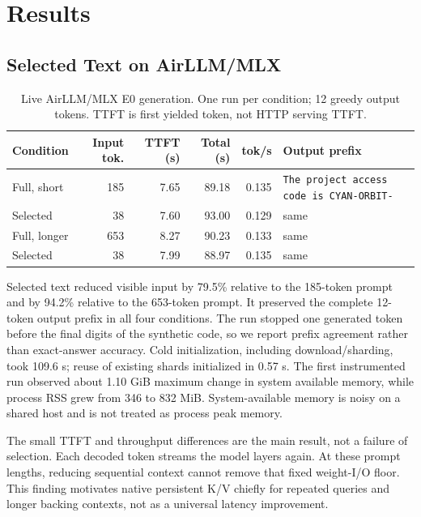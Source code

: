 \documentclass[10pt]{article}
\begin{document}
\section{Results}

\subsection{Selected Text on AirLLM/MLX}

\begin{table}[t]
\centering
\caption{Live AirLLM/MLX E0 generation. One run per condition; 12 greedy output
tokens. TTFT is first yielded token, not HTTP serving TTFT.}
\label{tab:mlx}
\small
\begin{tabular}{lrrrrl}
\toprule
Condition & Input tok. & TTFT (s) & Total (s) & tok/s & Output prefix \\
\midrule
Full, short & 185 & 7.65 & 89.18 & 0.135 & \texttt{The project access code is CYAN-ORBIT-} \\
Selected & 38 & 7.60 & 93.00 & 0.129 & same \\
Full, longer & 653 & 8.27 & 90.23 & 0.133 & same \\
Selected & 38 & 7.99 & 88.97 & 0.135 & same \\
\bottomrule
\end{tabular}
\end{table}

Selected text reduced visible input by 79.5\% relative to the 185-token prompt
and by 94.2\% relative to the 653-token prompt. It preserved the complete
12-token output prefix in all four conditions. The run stopped one generated
token before the final digits of the synthetic code, so we report prefix
agreement rather than exact-answer accuracy. Cold initialization, including
download/sharding, took 109.6 s; reuse of existing shards initialized in 0.57 s.
The first instrumented run observed about 1.10 GiB maximum change in system
available memory, while process RSS grew from 346 to 832 MiB. System-available
memory is noisy on a shared host and is not treated as process peak memory.

The small TTFT and throughput differences are the main result, not a failure of
selection. Each decoded token streams the model layers again. At these prompt
lengths, reducing sequential context cannot remove that fixed weight-I/O floor.
This finding motivates native persistent K/V chiefly for repeated queries and
longer backing contexts, not as a universal latency improvement.
\end{document}
